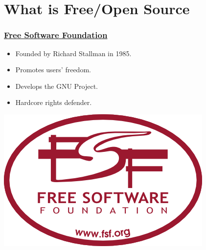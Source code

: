\documentclass[hyperref={pdfpagelabels=false},xcolor=pst,pdf,fragile]{beamer}
\title{\Title}
\author{\Author\\ \Matricula}
\date{\today}
\begin{document}
\maketitle



\section{What is Free/Open Source}

\begin{frame}
  \frametitle{
	  \href{https://www.fsf.org}
	  {Free Software Foundation}
  }

  \begin{itemize}
	\item Founded by Richard Stallman in 1985.
	\item Promotes users' freedom.
	\item Develops the GNU Project.
	\item Hardcore rights defender.
  \end{itemize}

  \begin{center}
	  \includegraphics[scale=0.4]{img/fsf.png}
  \end{center}

\end{frame}
\end{document}

